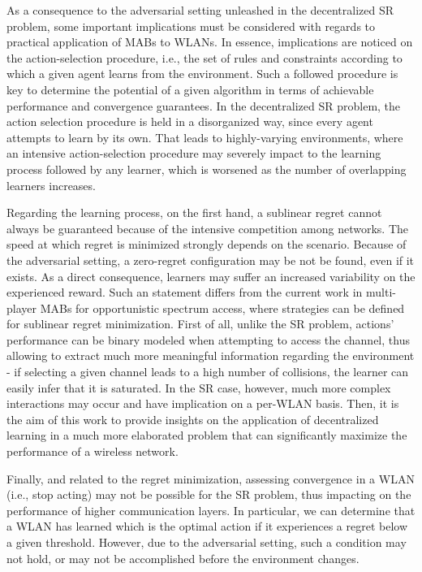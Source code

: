 \documentclass[preprint,12pt]{elsarticle}
\begin{document}
As a consequence to the adversarial setting unleashed in the decentralized SR problem, some important implications must be considered with regards to practical application of MABs to WLANs. In essence, implications are noticed on the action-selection procedure, i.e., the set of rules and constraints according to which a given agent learns from the environment. Such a followed procedure is key to determine the potential of a given algorithm in terms of achievable performance and convergence guarantees. In the decentralized SR problem, the action selection procedure is held in a disorganized way, since every agent attempts to learn by its own. That leads to highly-varying environments, where an intensive action-selection procedure may severely impact to the learning process followed by any learner, which is worsened as the number of overlapping learners increases. %

Regarding the learning process, on the first hand, a sublinear regret cannot always be guaranteed because of the intensive competition among networks. The speed at which regret is minimized strongly depends on the scenario. Because of the adversarial setting, a zero-regret configuration may be not be found, even if it exists. As a direct consequence, learners may suffer an increased variability on the experienced reward. Such an statement differs from the current work in multi-player MABs for opportunistic spectrum access, where strategies can be defined for sublinear regret minimization. First of all, unlike the SR problem, actions' performance can be binary modeled when attempting to access the channel, thus allowing to extract much more meaningful information regarding the environment - if selecting a given channel leads to a high number of collisions, the learner can easily infer that it is saturated. In the SR case, however, much more complex interactions may occur and have implication on a per-WLAN basis. Then, it is the aim of this work to provide insights on the application of decentralized learning in a much more elaborated problem that can significantly maximize the performance of a wireless network.

Finally, and related to the regret minimization, assessing convergence in a WLAN (i.e., stop acting) may not be possible for the SR problem, thus impacting on the performance of higher communication layers. In particular, we can determine that a WLAN has learned which is the optimal action if it experiences a regret below a given threshold. However, due to the adversarial setting, such a condition may not hold, or may not be accomplished before the environment changes. 
\end{document}
